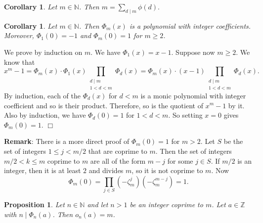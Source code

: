 \documentclass{article}
\def\Z{{\mathbb Z}}
\def\N{{\mathbb N}}
\def\Z{{\mathbb Z}}
\newtheorem{cor}[subsection]{Corollary}
\newtheorem{proposition}[subsection]{Proposition}
\newenvironment{proof}{\noindent {\bf Proof:}}{$\Box$ \vspace{2 ex}}
\begin{document}
\begin{cor}\label{cor:sumphi}
    Let $m\in\N$. Then $\displaystyle m = \sum_{d\mid m}\phi(d).$
\end{cor}

\begin{cor}
    Let $m\in\N$. Then $\Phi_m(x)$ is a polynomial with integer coefficients. Moreover, $\Phi_1(0) = -1$ and $\Phi_m(0) = 1$ for $m\geq 2$.
\end{cor}

\begin{proof}
    We prove by induction on $m$. We have $\Phi_1(x) = x - 1$. Suppose now $m\geq 2$. We know that
    $$x^m - 1 = \Phi_m(x)\cdot\Phi_1(x)\prod_{\substack{d\mid m\\ 1 <d < m}}\Phi_d(x) = \Phi_m(x)\cdot(x - 1)\prod_{\substack{d\mid m\\ 1 <d < m}}\Phi_d(x).$$
    By induction, each of the $\Phi_d(x)$ for $d<m$ is a monic polynomial with integer coefficient and so is their product. Therefore, so is the quotient of $x^m - 1$ by it. Also by induction, we have $\Phi_d(0) = 1$ for $1<d<m$. So setting $x = 0$ gives $\Phi_m(0) = 1$.
\end{proof}

\noindent\textbf{Remark}: There is a more direct proof of $\Phi_m(0) = 1$ for $m>2$. Let $S$ be the set of integers $1\leq j < m/2$ that are coprime to $m$. Then the set of integers $m/2 < k \leq m$ coprime to $m$ are all of the form $m - j$ for some $j\in S$. If $m/2$ is an integer, then it is at least $2$ and divides $m$, so it is not coprime to $m$. Now
$$\Phi_m(0) = \prod_{j\in S}(-\zeta_m^j)(-\zeta_m^{m-j}) = 1.$$

\begin{proposition}
    Let $n\in\N$ and let $n>1$ be an integer coprime to $m$. Let $a\in\Z$ with $n\mid \Phi_n(a)$. Then $o_n(a) = m$.
\end{proposition}
\end{document}
